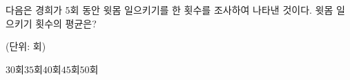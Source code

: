 다음은 경희가 $5$회 동안 윗몸 일으키기를 한 횟수를 조사하여 나타낸 것이다. 윗몸 일으키기 횟수의 평균은?\par\noindent\hfill{\footnotesize (단위: 회)}
\begin{choices32}{$30$회}{$35$회}{$40$회}{$45$회}{$50$회}\end{choices32}
